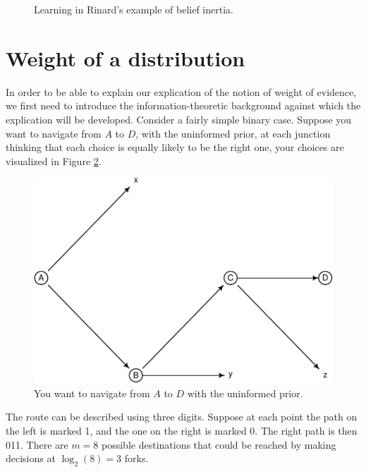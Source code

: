 \documentclass[
  10pt,
  dvipsnames,enabledeprecatedfontcommands]{scrartcl}
\begin{document}
\begin{figure}[H]

\caption{Learning in Rinard's example of belief inertia.}
\label{fig:rinard2}
\end{figure}


\hypertarget{weight-of-a-distribution}{%
\section{Weight of a distribution}\label{weight-of-a-distribution}}

In order to be able to explain our explication of the notion of weight
of evidence, we first need to introduce the information-theoretic
background against which the explication will be developed. Consider a
fairly simple binary case. Suppose you want to navigate from \(A\) to
\(D\), with the uninformed prior, at each junction thinking that each
choice is equally likely to be the right one, your choices are
visualized in Figure \ref{fig:entDAG}.

\begin{figure}[H]

\begin{center}\includegraphics[width=0.7\linewidth]{imprecision_weight_files/figure-latex/label-1} \end{center}
\caption{You want to navigate from $A$ to $D$ with the uninformed prior.}
\label{fig:entDAG}
\end{figure}

The route can be described using three digits. Suppose at each point the
path on the left is marked 1, and the one on the right is marked 0. The
right path is then 011. There are \(m=8\) possible destinations that
could be reached by making decisions at \(\log_2(8)=3\) forks.
\end{document}
